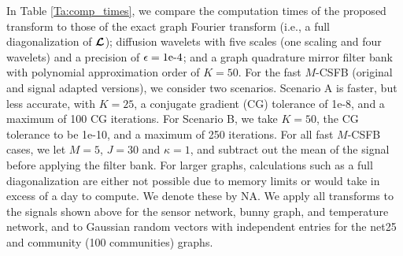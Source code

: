 \documentclass[journal, 10pt]{IEEEtran}
\begin{document}
In Table \ref{Ta:comp_times}, %
we compare the computation times of the proposed transform to those of the exact graph Fourier transform (i.e., a full diagonalization of $\boldsymbol{\mathcal{L}}$); diffusion wavelets \cite{coifman2006diffusion} with five scales (one scaling and four wavelets) and a precision of $\epsilon=1\hbox{e-4}$; and a graph quadrature mirror filter bank \cite{narang2012perfect} with polynomial approximation order of $K=50$.
For the fast $M$-CSFB (original and signal adapted versions), we consider two scenarios. Scenario A is faster, but less accurate, with $K=25$, a conjugate gradient (CG) tolerance of 1e-8, and a maximum of 100 CG iterations. For Scenario B, we take $K=50$, the CG tolerance to be 1e-10, and a maximum of 250 iterations. For all fast $M$-CSFB cases, we let $M=5$, $J=30$ and $\kappa=1$, and subtract out the mean of the signal before applying the filter bank. For larger graphs, calculations such as a  full diagonalization are either not possible due to memory limits or would take in excess of a day to compute. We denote these by NA. 
We apply all transforms to the signals shown above for the sensor network, bunny graph, and temperature network,
and to Gaussian random vectors with independent entries for the 
net25 and community (100 communities) graphs.
\end{document}
